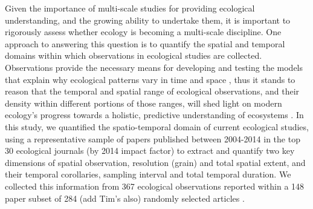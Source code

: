 \documentclass[12pt]{article}
\begin{document}
Given the importance of multi-scale studies for providing ecological understanding, and the growing ability to undertake them, it is important to rigorously assess whether ecology is becoming a multi-scale discipline. One approach to answering this question is to quantify the spatial and temporal domains within which observations in ecological studies are collected. Observations provide the necessary means for developing and testing the models that explain why ecological patterns vary in time and space \cite{levin_problem_1992,tilman_ecological_1989}, thus it stands to reason that the temporal and spatial range of ecological observations, and their density within different portions of those ranges, will shed light on modern ecology's progress towards a holistic, predictive understanding of ecosystems \cite{chave_problem_2013,levin_problem_1992}. In this study, we quantified the spatio-temporal domain of current ecological studies, using a representative sample of papers published between 2004-2014 in the top 30 ecological journals (by 2014 impact factor) to extract and quantify two key dimensions of spatial observation, resolution (grain) and total spatial extent, and their temporal corollaries, sampling interval and total temporal duration. We collected this information from 367 ecological observations \cite[defined here as non-manipulated, or ``natural'']{tilman_ecological_1989} reported within a 148 paper subset of 284 (add Tim's also) randomly selected articles . 

\end{document}
